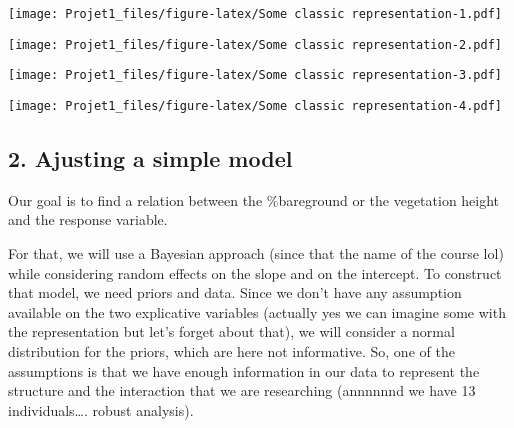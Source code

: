 \documentclass[
]{article}
\newenvironment{Shaded}{\begin{snugshade}}{\end{snugshade}}
\newcommand{\FunctionTok}[1]{\textcolor[rgb]{0.13,0.29,0.53}{\textbf{#1}}}
\newcommand{\NormalTok}[1]{#1}
\newcommand{\SpecialCharTok}[1]{\textcolor[rgb]{0.81,0.36,0.00}{\textbf{#1}}}
\begin{document}
\texttt{[image: Projet1\_files/figure-latex/Some classic representation-1.pdf]}

\begin{Shaded}
\end{Shaded}

\texttt{[image: Projet1\_files/figure-latex/Some classic representation-2.pdf]}

\begin{Shaded}
\end{Shaded}

\texttt{[image: Projet1\_files/figure-latex/Some classic representation-3.pdf]}

\begin{Shaded}
\end{Shaded}

\texttt{[image: Projet1\_files/figure-latex/Some classic representation-4.pdf]}

\subsection{2. Ajusting a simple model}\label{ajusting-a-simple-model}

Our goal is to find a relation between the \%bareground or the
vegetation height and the response variable.

For that, we will use a Bayesian approach (since that the name of the
course lol) while considering random effects on the slope and on the
intercept. To construct that model, we need priors and data. Since we
don't have any assumption available on the two explicative variables
(actually yes we can imagine some with the representation but let's
forget about that), we will consider a normal distribution for the
priors, which are here not informative. So, one of the assumptions is
that we have enough information in our data to represent the structure
and the interaction that we are researching (annnnnnd we have 13
individuals\ldots. robust analysis).
\end{document}
